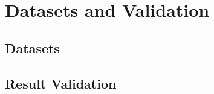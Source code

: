 \chapter{Datasets and Validation}\label{chap:validation}

\section*{}

\section{Datasets}\label{sec:datasets}

\section{Result Validation}\label{sec:validation}
